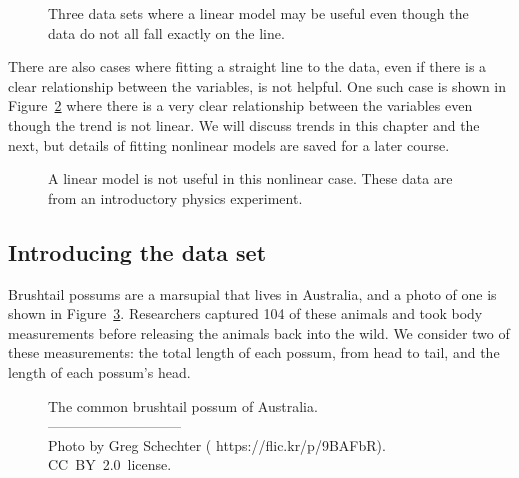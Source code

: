 \begin{figure}
   \centering
   \caption{Three data sets where a linear model may be useful
       even though the data do not all fall exactly on the line.}
   \label{imperfLinearModel}
\end{figure}

There are also cases where fitting a straight line to the data,
even if there is a clear relationship between the variables,
is not helpful.
One such case is shown in
Figure~\ref{notGoodAtAllForALinearModel}
where there is a very clear relationship between the variables
even though the trend is not linear.
We will discuss  trends in this chapter
and the next, but details of fitting nonlinear models
are saved for a later course.

\begin{figure}
   \centering
   \caption{A linear model is not useful in this nonlinear case.
       These data are from an introductory physics experiment.}
   \label{notGoodAtAllForALinearModel}
\end{figure}




\subsection{Introducing the  data set}


Brushtail possums are a marsupial that lives in Australia,
and a photo of one is shown in
Figure~\ref{brushtail_possum}.
Researchers captured 104 of these animals and took body
measurements before releasing the animals back into the wild.
We consider two of these measurements:
the total length of each possum, from head to tail,
and the length of each possum's head.

\setlength{\captionwidth}{0.83\mycaptionwidth}
\begin{figure}[h]
  \centering
  \caption{The common brushtail possum of Australia.\vspace{-1mm} \\
      -----------------------------\vspace{-2mm}\\
      {\footnotesize Photo by Greg Schechter
      (
          {https://flic.kr/p/9BAFbR}).
          {CC~BY~2.0~license}.}}
  \label{brushtail_possum}
\end{figure}
\setlength{\captionwidth}{\mycaptionwidth}


